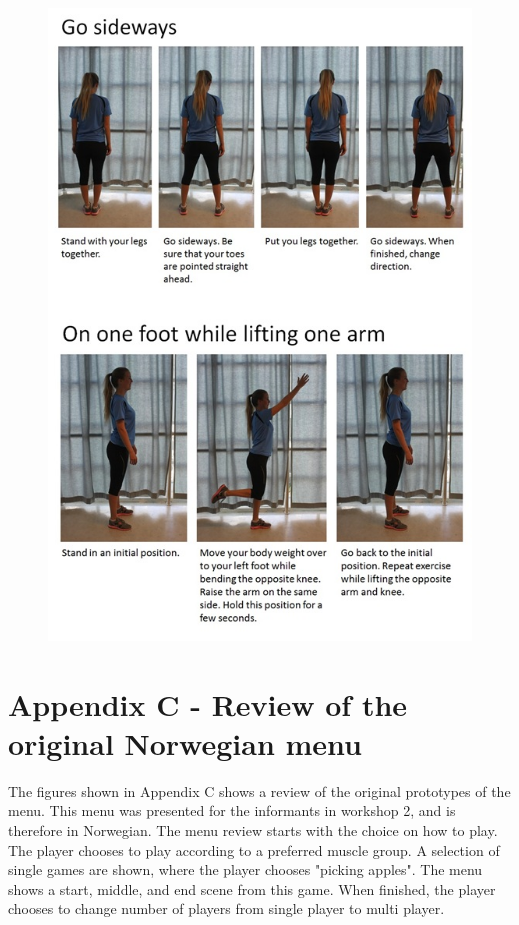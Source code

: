 \begin{figure} [H]
\centering
\includegraphics[scale=0.8]{GoSideways.jpg}
\label{gosideways}
\end{figure} 

\newpage
\section*{Appendix C - Review of the original Norwegian menu}
\label{app:menureview}

The figures shown in Appendix C shows a review of the original prototypes of the menu. This menu was presented for the informants in workshop 2, and is therefore in Norwegian. The menu review starts with the choice on how to play. The player chooses to play according to a preferred muscle group. A selection of single games are shown, where the player chooses "picking apples". The menu shows a start, middle, and end scene from this game. When finished, the player chooses to change number of players from single player to multi player.  

